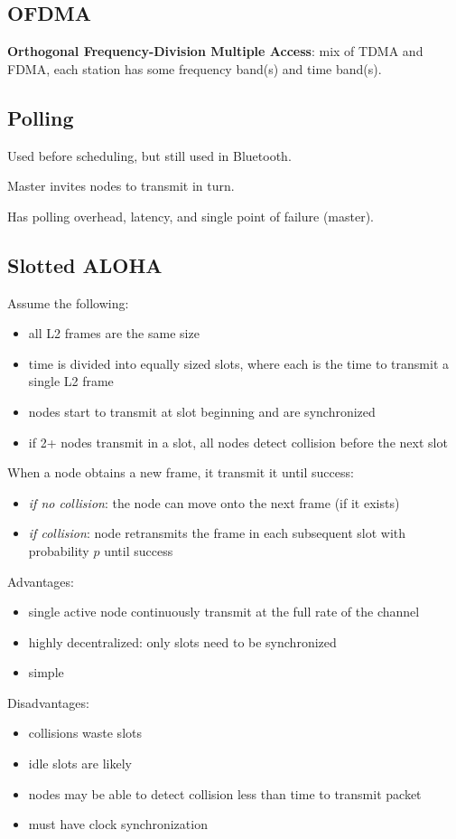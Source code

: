 \documentclass[11pt]{article}
\begin{document}
\subsection{OFDMA}
\label{sec:orgedd6aa0}
\textbf{Orthogonal Frequency-Division Multiple Access}: mix of TDMA and FDMA, each station has some frequency
band(s) and time band(s).
\subsection{Polling}
\label{sec:orgc5df19e}
Used before scheduling, but still used in Bluetooth.

Master invites nodes to transmit in turn.

Has polling overhead, latency, and single point of failure (master).
\subsection{Slotted ALOHA}
\label{sec:org3d7f5ac}
Assume the following:
\begin{itemize}
\item all L2 frames are the same size
\item time is divided into equally sized slots, where each is the time to transmit a single L2 frame
\item nodes start to transmit at slot beginning and are synchronized
\item if 2+ nodes transmit in a slot, all nodes detect collision before the next slot
\end{itemize}

When a node obtains a new frame, it transmit it until success:
\begin{itemize}
\item \emph{if no collision}: the node can move onto the next frame (if it exists)
\item \emph{if collision}: node retransmits the frame in each subsequent slot with probability \(p\) until success
\end{itemize}

Advantages:
\begin{itemize}
\item single active node continuously transmit at the full rate of the channel
\item highly decentralized: only slots need to be synchronized
\item simple
\end{itemize}

Disadvantages:
\begin{itemize}
\item collisions waste slots
\item idle slots are likely
\item nodes may be able to detect collision less than time to transmit packet
\item must have clock synchronization
\end{itemize}
\end{document}
